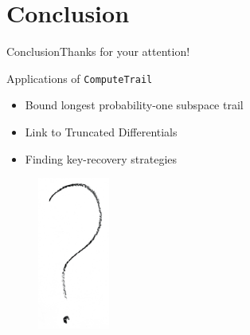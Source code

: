 \documentclass[%
    10pt,
    professionalfont,
    aspectratio=169,
    handout,
]{beamer}
\begin{document}
\section{Conclusion}
\begin{frame}{Conclusion}{Thanks for your attention!}
    \centering
    \begin{minipage}{0.5\textwidth}
    \begin{block}{Applications of \texttt{ComputeTrail}}
        \begin{itemize}
            \item Bound longest probability-one subspace trail
            \item Link to Truncated Differentials
            \item Finding key-recovery strategies
        \end{itemize}
    \end{block}
    \end{minipage}
    \begin{minipage}{0.45\textwidth}
        \centering
        \begin{figure}[!htb]
            \includegraphics[height=50mm]{data/flickr/questionmark.png}
        \end{figure}
    \end{minipage}
\end{frame}

\end{document}
